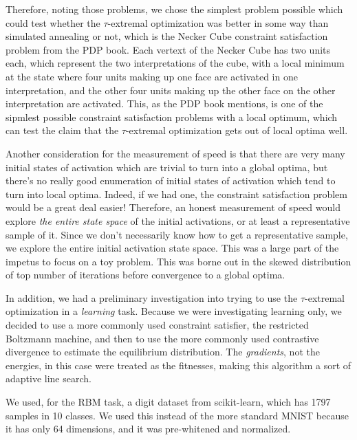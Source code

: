 \documentclass[12pt]{article}
\begin{document}
Therefore, noting those problems, we chose the simplest problem possible which could test whether the $\tau$-extremal optimization was better in some way than simulated annealing or not, which is the Necker Cube constraint satisfaction problem from the PDP book. Each vertext of the Necker Cube has two units each, which represent the two interpretations of the cube, with a local minimum at the state where four units making up one face are activated in one interpretation, and the other four units making up the other face on the other interpretation are activated. This, as the PDP book mentions, is one of the sipmlest possible constraint satisfaction problems with a local optimum, which can test the claim that the $\tau$-extremal optimization gets out of local optima well.

Another consideration for the measurement of speed is that there are very many initial states of activation which are trivial to turn into a global optima, but there's no really good enumeration of initial states of activation which tend to turn into local optima. Indeed, if we had one, the constraint satisfaction problem would be a great deal easier! Therefore, an honest measurement of speed would explore \emph{the entire state space} of the initial activations, or at least a representative sample of it. Since we don't necessarily know how to get a representative sample, we explore the entire initial activation state space. This was a large part of the impetus to focus on a toy problem. This was borne out in the skewed distribution of top number of iterations before convergence to a global optima.

In addition, we had a preliminary investigation into trying to use the $\tau$-extremal optimization in a \emph{learning} task. Because we were investigating learning only, we decided to use a more commonly used constraint satisfier, the restricted Boltzmann machine, and then to use the more commonly used contrastive divergence to estimate the equilibrium distribution. The \emph{gradients}, not the energies, in this case were treated as the fitnesses, making this algorithm a sort of adaptive line search.

We used, for the RBM task, a digit dataset from scikit-learn, which has 1797 samples in 10 classes. We used this instead of the more standard MNIST because it has only 64 dimensions, and it was pre-whitened and normalized.
\end{document}

